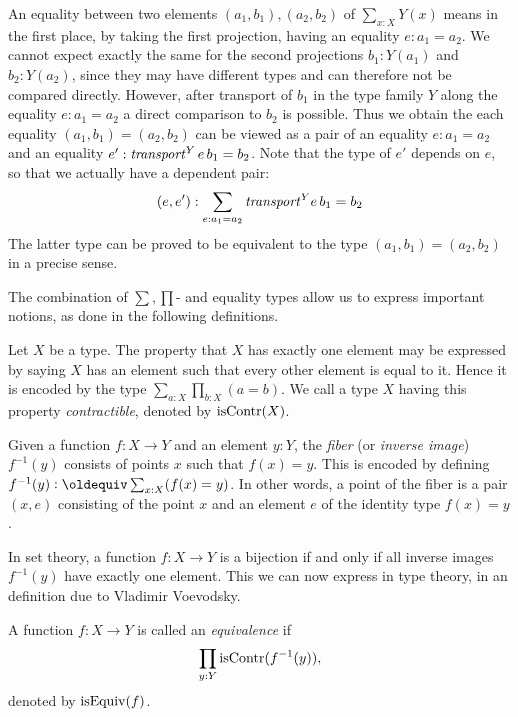 An equality between two elements $(a_1,b_1),(a_2,b_2)$ of 
$\sum _{x:X} Y(x)$ means in the first place, by taking
the first projection, having an equality $e: a_1=a_2$.
We cannot expect exactly the same for the second 
projections $b_1: Y(a_1)$ and $b_2: Y(a_2)$, since they may
have different types and can therefore not be compared directly.
However, after transport of $b_1$ in the type family $Y$
along the equality $e: a_1=a_2$ a direct comparison to $b_2$
is possible. Thus we obtain the each equality $(a_1,b_1)=(a_2,b_2)$
can be viewed as a pair of an equality $e: a_1=a_2$ and an
equality $e' : \mathop{\mathit{transport}}^Y e\, b_1 = b_2$. Note that the type
of $e'$ depends on $e$, so that we actually have a dependent pair:
\[
(e,e'): \sum_{e:a_1 = a_2} {\mathop{\mathit{transport}}}^Y e\, b_1 = b_2
\]
The latter type can be proved to be equivalent to the
type $(a_1,b_1)=(a_2,b_2)$ in a precise sense.

The combination of $\sum,\prod$- and equality types allow
us to express important notions, as done in the following
definitions.

\begin{definition}
\label{def:contractible}
Let $X$ be a type.  The property that $X$ has exactly one element may be expressed by saying $X$ has an element such that every other element is
equal to it.  Hence it is encoded by the type $\sum_{a:X} \prod_{b:X} (a=b)$.
We call a type $X$ having this property \emph{contractible}, denoted by $\mathrm{isContr}(X)$.
\end{definition}

\begin{definition}
\label{def:fiber}
Given a function $f : X \to Y$ and an element $y:Y$, the \emph{fiber} (or \emph{inverse image}) $f^{-1}(y)$ consists of points $x$ such that $f(x)
= y$.  This is encoded by defining $f^{-1}(y) \defeq \sum_{x:X} (f(x) = y)$.  In other words, a point of the fiber is a pair $(x,e)$ consisting
of the point $x$ and an element $e$ of the identity type $f(x) = y$.
\end{definition}

In set theory, a function $f : X \to Y$ is a bijection if and only if
all inverse images $f^{-1}(y)$ have exactly one element.
This we can now express in type theory, in an definition due
to Vladimir Voevodsky. 

\begin{definition}
\label{def:equivalence}
A function $f : X \to Y$ is called an \emph{equivalence} if
\[
\prod_{y:Y} \mathrm{isContr}(f^{-1}(y)),
\]
denoted by $\mathrm{isEquiv}(f)$.
\end{definition}

